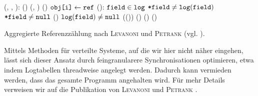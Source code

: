 \begin{algorithm}[h]
\begin{algorithmic}[1]
	\State \Atomic {}(, , ):
	\State \quad \IF \NOT {}()
	\State \quad \quad {}(, )	
	\State \quad \quad {}()		
	\State \quad $\texttt{obj[i]} \gets \texttt{ref}$
	\Statex
	\State \Atomic {}():
	\State \quad \FOREACH $\texttt{field} \in \texttt{log}$
	\State \quad \quad \IF $\texttt{*field} \neq \texttt{log}(\texttt{field})$	
	\State \quad \quad \quad \IF $\texttt{*field} \neq \texttt{null}$
	\State \quad \quad \quad \quad {}()	
	\State \quad \quad \quad \IF $\texttt{log}(\texttt{field}) \neq \texttt{null}$
	\State \quad \quad \quad \quad {}(())	
	\State \quad \quad {}()	
	\State \quad \quad {}()		
	\State \quad {}()		
\end{algorithmic}
\caption[Aggregierte Referenzzählung nach \textsc{Levanoni} und \textsc{Petrank}]{Aggregierte Referenzzählung nach \textsc{Levanoni} und \textsc{Petrank} (vgl. \cite[S. 14ff]{levanoni2006}).}
\label{algo:coalesced-rc}
\end{algorithm}

Mittels Methoden für verteilte Systeme, auf die wir hier nicht näher eingehen, lässt sich dieser Ansatz durch feingranularere Synchronisationen optimieren, etwa indem Logtabellen threadweise angelegt werden.
Dadurch kann vermieden werden, dass das gesamte Programm angehalten wird.
Für mehr Details verweisen wir auf die Publikation von \textsc{Levanoni} und \textsc{Petrank} \cite[S. 19]{levanoni2006}.
